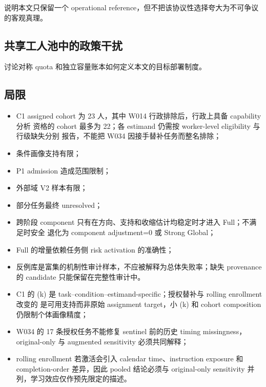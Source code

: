 说明本文只保留一个 operational reference，但不把该协议性选择夸大为不可争议的客观真理。

\subsection{共享工人池中的政策干扰}

讨论对称 quota 和独立容量账本如何定义本文的目标部署制度。

\subsection{局限}

\begin{itemize}
  \item C1 assigned cohort 为 23 人，其中 W014 行政排除后，行政上具备 capability 分析
  资格的 cohort 最多为 22；各 estimand 仍需按 worker-level eligibility 与行级缺失分别
  报告，不能把 W034 因接手替补任务而整名排除；
  \item 条件画像支持有限；
  \item P1 admission 造成范围限制；
  \item 外部域 V2 样本有限；
  \item 部分任务最终 unresolved；
  \item 跨阶段 component 只有在方向、支持和收缩估计均稳定时才进入 Full；不满足时安全
  退化为 component adjustment=0 或 Strong Global；
  \item Full 的增量依赖任务侧 risk activation 的准确性；
  \item 反例库是富集的机制性审计样本，不应被解释为总体失败率；缺失 provenance 的
  candidate 只能保留在完整性审计中。
  \item C1 的 (k) 是 task--condition--estimand-specific；授权替补与 rolling enrollment 改变的
  是可用支持而非原始 assignment target，小 (k) 和 cohort composition 仍限制个体画像精度；
  \item W034 的 17 条授权任务不能修复 sentinel 前的历史 timing missingness，original-only 与
  augmented sensitivity 必须共同解释；
  \item rolling enrollment 若激活会引入 calendar time、instruction exposure 和 completion-order
  差异，因此 pooled 结论必须与 original-only sensitivity 并列，学习效应仅作预先限定的描述。
\end{itemize}

